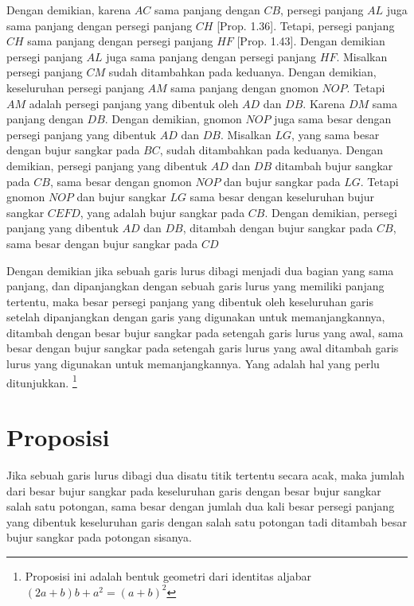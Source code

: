 \documentclass[a4paper]{book}
\begin{document}
Dengan demikian, karena $AC$ sama panjang dengan $CB$, persegi panjang $AL$ 
juga sama panjang dengan persegi panjang $CH$ [Prop. 1.36]. Tetapi, persegi
panjang $CH$ sama panjang dengan persegi panjang $HF$ [Prop. 1.43]. Dengan 
demikian persegi panjang $AL$ juga sama panjang dengan persegi panjang $HF$.
Misalkan persegi panjang $CM$ sudah ditambahkan pada keduanya. Dengan demikian,
keseluruhan persegi panjang $AM$ sama panjang dengan gnomon $NOP$.  Tetapi $AM$
adalah persegi panjang yang dibentuk oleh $AD$ dan $DB$. Karena $DM$ sama 
panjang dengan $DB$. Dengan demikian, gnomon $NOP$ juga sama besar dengan 
persegi panjang yang dibentuk $AD$  dan $DB$. Misalkan $LG$, yang 
sama besar dengan bujur sangkar pada $BC$, sudah ditambahkan pada keduanya.
Dengan demikian, persegi panjang yang dibentuk $AD$ dan $DB$ ditambah bujur
sangkar pada $CB$, sama besar dengan gnomon $NOP$ dan bujur sangkar pada
$LG$. Tetapi gnomon $NOP$ dan bujur sangkar $LG$ sama besar dengan keseluruhan
bujur sangkar $CEFD$, yang adalah bujur sangkar pada $CB$. Dengan demikian,
persegi panjang yang dibentuk $AD$ dan $DB$, ditambah dengan bujur sangkar 
pada $CB$, sama besar dengan bujur sangkar pada $CD$

Dengan demikian jika sebuah garis lurus dibagi menjadi dua bagian yang sama 
panjang, dan dipanjangkan dengan sebuah garis lurus yang memiliki panjang tertentu, 
maka besar persegi panjang yang dibentuk oleh keseluruhan garis setelah dipanjangkan 
 dengan garis yang digunakan untuk memanjangkannya, ditambah dengan besar bujur 
sangkar pada setengah garis lurus yang awal, sama besar dengan bujur sangkar 
pada setengah garis lurus yang awal ditambah garis lurus yang 
digunakan untuk memanjangkannya. Yang adalah hal yang perlu ditunjukkan.
\footnote{Proposisi ini adalah bentuk
geometri dari identitas aljabar $(2a + b)b + a^2 = (a + b)^2 $ }

\section*{\centering Proposisi \thesection} 

Jika sebuah garis lurus dibagi dua disatu titik tertentu secara acak, maka jumlah
dari besar bujur sangkar pada keseluruhan garis dengan besar bujur sangkar salah satu 
potongan, sama besar dengan jumlah dua kali besar persegi panjang yang dibentuk
keseluruhan garis dengan salah satu potongan tadi ditambah besar bujur sangkar pada potongan
sisanya.
\end{document}
